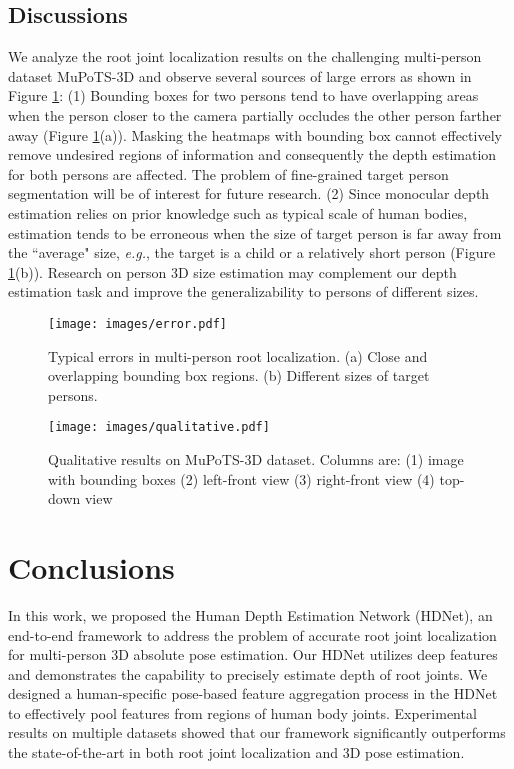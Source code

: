 \documentclass[runningheads]{llncs}
\begin{document}
\subsection{Discussions}

We analyze the root joint localization results on the challenging multi-person dataset MuPoTS-3D and observe several sources of large errors as shown in Figure \ref{fig:error}:
(1) Bounding boxes for two persons tend to have overlapping areas when 
the person closer to the camera partially occludes the other person farther away (Figure \ref{fig:error}(a)). Masking the heatmaps with bounding box cannot effectively remove undesired regions of information and consequently the depth estimation for both persons are affected. The problem of fine-grained target person segmentation will be of interest for future research.
(2) Since monocular depth estimation relies on prior knowledge such as typical scale of human bodies, estimation tends to be erroneous when the size of target person is far away from the ``average" size, \textit{e.g.}, the target is a child or a relatively short person (Figure \ref{fig:error}(b)). Research on person 3D size estimation may complement our depth estimation task and improve the generalizability to persons of different sizes.


\begin{figure}[t]
\centering
\texttt{[image: images/error.pdf]}
\caption{Typical errors in multi-person root localization. (a) Close and overlapping bounding box regions. (b) Different sizes of target persons.}
\label{fig:error}
\end{figure}

\begin{figure}[t]
\centering
\texttt{[image: images/qualitative.pdf]}
\caption{Qualitative results on MuPoTS-3D dataset. Columns are: (1) image with bounding boxes (2) left-front view (3) right-front view (4) top-down view}
\label{fig:qualitative}
\end{figure}

\section{Conclusions}

In this work, we proposed the Human Depth Estimation Network (HDNet), an end-to-end framework to address the problem of accurate root joint localization for multi-person 3D absolute pose estimation. Our HDNet utilizes deep features and demonstrates the capability to precisely estimate depth of root joints. We designed a human-specific pose-based feature aggregation process in the HDNet to effectively pool features from regions of human body joints. Experimental results on multiple datasets showed that our framework significantly outperforms the state-of-the-art in both root joint localization and 3D pose estimation.




\clearpage


\end{document}
